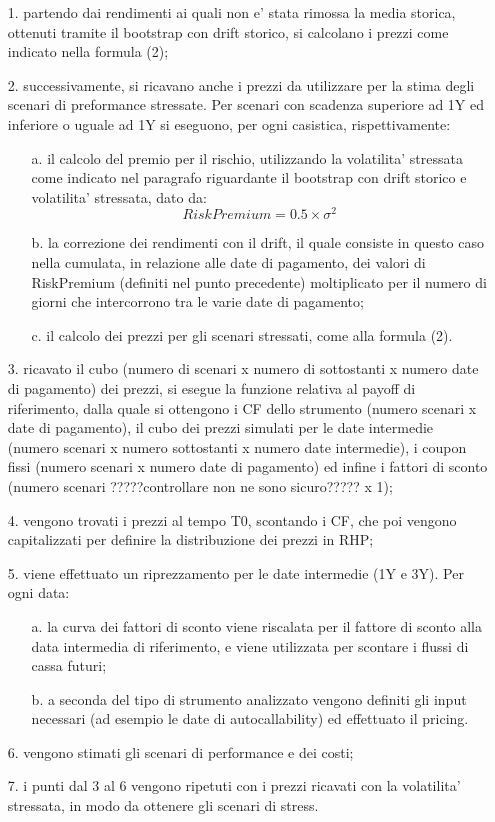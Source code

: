 \documentclass[11pt,fleqn]{extarticle}
\begin{document}
\begin{itemize}
\item[1.] partendo dai rendimenti ai quali non e' stata rimossa la media storica, ottenuti tramite il bootstrap con drift storico, si calcolano i prezzi come indicato nella formula (2);
\item[2.] successivamente, si ricavano anche i prezzi da utilizzare per la stima degli scenari di preformance stressate. Per scenari con scadenza superiore ad 1Y ed inferiore o uguale ad 1Y si eseguono, per ogni casistica, rispettivamente:
\begin{itemize}
\item[a.] il calcolo del premio per il rischio, utilizzando la volatilita' stressata come indicato nel paragrafo riguardante il bootstrap con drift storico e volatilita' stressata, dato da:
\begin{equation}
RiskPremium =  0.5\times \sigma^2
\end{equation}
\item[b.] la correzione dei rendimenti con il drift, il quale consiste in questo caso nella cumulata, in relazione alle date di pagamento, dei valori di RiskPremium (definiti nel punto precedente) moltiplicato per il numero di giorni che intercorrono tra le varie date di pagamento;
\item[c.] il calcolo dei prezzi per gli scenari stressati, come alla formula (2).
\end{itemize}
\item[3.] ricavato il cubo (numero di scenari x numero di sottostanti x numero date di pagamento) dei prezzi, si esegue la funzione relativa al payoff di riferimento, dalla quale si ottengono i CF dello strumento (numero scenari x date di pagamento), il cubo dei prezzi simulati per le date intermedie (numero scenari x numero sottostanti x numero date intermedie), i coupon fissi (numero scenari x numero date di pagamento) ed infine i fattori di sconto (numero scenari ?????controllare non ne sono sicuro????? x 1);
\item[4.] vengono trovati i prezzi al tempo T0, scontando i CF, che poi vengono capitalizzati per definire la distribuzione dei prezzi in RHP;
\item[5.] viene effettuato un riprezzamento per le date intermedie (1Y e 3Y). Per ogni data:
\begin{itemize}
\item[a.] la curva dei fattori di sconto viene riscalata per il fattore di sconto alla data intermedia di riferimento, e viene utilizzata per scontare i flussi di cassa futuri;
\item[b.] a seconda del tipo di strumento analizzato vengono definiti gli input necessari (ad esempio le date di autocallability) ed effettuato il pricing.
\end{itemize}
\item[6.] vengono stimati gli scenari di performance e dei costi;
\item[7.] i punti dal 3 al 6 vengono ripetuti con i prezzi ricavati con la volatilita' stressata, in modo da ottenere gli scenari di stress.
\end{itemize}
\end{document}
